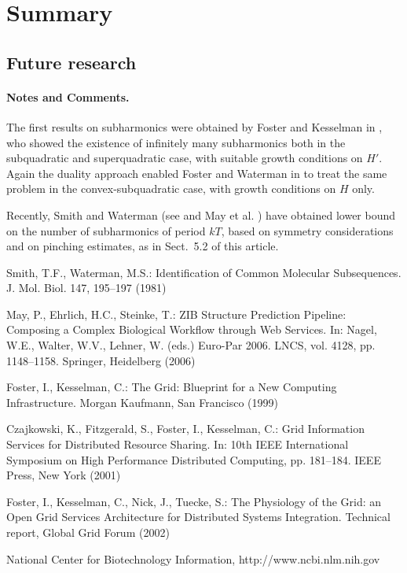 \documentclass[lnbip]{svmultln}
\begin{document}
\section{Summary}
\subsection{Future research}

\paragraph{Notes and Comments.}
The first results on subharmonics were
obtained by Foster and Kesselman in \cite{fos:kes}, who showed the existence of
infinitely many subharmonics both in the subquadratic and superquadratic
case, with suitable growth conditions on $H'$. Again the duality
approach enabled Foster and Waterman in \cite{fos:kes:2} to treat the
same problem in the convex-subquadratic case, with growth conditions on
$H$ only.

Recently, Smith and Waterman (see \cite{smit:wat} and May et al. \cite{mes})
have obtained lower bound on the number of subharmonics of period $kT$,
based on symmetry considerations and on pinching estimates, as in
Sect.~5.2 of this article.

%
%
\begin{thebibliography}{5}

 Smith, T.F., Waterman, M.S.: Identification of Common Molecular
Subsequences. J. Mol. Biol. 147, 195--197 (1981)

 May, P., Ehrlich, H.C., Steinke, T.: ZIB Structure Prediction Pipeline:
Composing a Complex Biological Workflow through Web Services. In: Nagel,
W.E., Walter, W.V., Lehner, W. (eds.) Euro-Par 2006. LNCS, vol. 4128,
pp. 1148--1158. Springer, Heidelberg (2006)

 Foster, I., Kesselman, C.: The Grid: Blueprint for a New Computing
Infrastructure. Morgan Kaufmann, San Francisco (1999)

 Czajkowski, K., Fitzgerald, S., Foster, I., Kesselman, C.: Grid
Information Services for Distributed Resource Sharing. In: 10th IEEE
International Symposium on High Performance Distributed Computing, pp.
181--184. IEEE Press, New York (2001)

 Foster, I., Kesselman, C., Nick, J., Tuecke, S.: The Physiology of the
Grid: an Open Grid Services Architecture for Distributed Systems
Integration. Technical report, Global Grid Forum (2002)

 National Center for Biotechnology Information, http://www.ncbi.nlm.nih.gov

\end{thebibliography}
%
\end{document}
